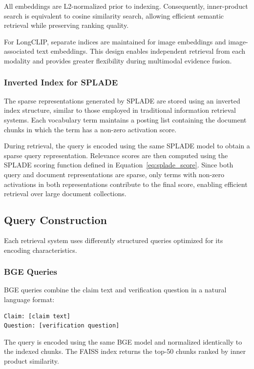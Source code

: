 All embeddings are L2-normalized prior to indexing. Consequently, inner-product search is equivalent to cosine similarity search, allowing efficient semantic retrieval while preserving ranking quality.

For LongCLIP, separate indices are maintained for image embeddings and image-associated text embeddings. This design enables independent retrieval from each modality and provides greater flexibility during multimodal evidence fusion.

\subsubsection{Inverted Index for SPLADE}

The sparse representations generated by SPLADE are stored using an inverted index structure, similar to those employed in traditional information retrieval systems. Each vocabulary term maintains a posting list containing the document chunks in which the term has a non-zero activation score.


During retrieval, the query is encoded using the same SPLADE model to obtain a sparse query representation. Relevance scores are then computed using the SPLADE scoring function defined in Equation~\ref{eq:splade_score}. Since both query and document representations are sparse, only terms with non-zero activations in both representations contribute to the final score, enabling efficient retrieval over large document collections.

\subsection{Query Construction}
\label{ch:queryConstruction}

Each retrieval system uses differently structured queries optimized for its encoding characteristics.

\subsubsection{BGE Queries}

BGE queries combine the claim text and verification question in a natural language format:

\begin{verbatim}
Claim: [claim text]
Question: [verification question]
\end{verbatim}

The query is encoded using the same BGE model and normalized identically to the indexed chunks. The FAISS index returns the top-50 chunks ranked by inner product similarity.

